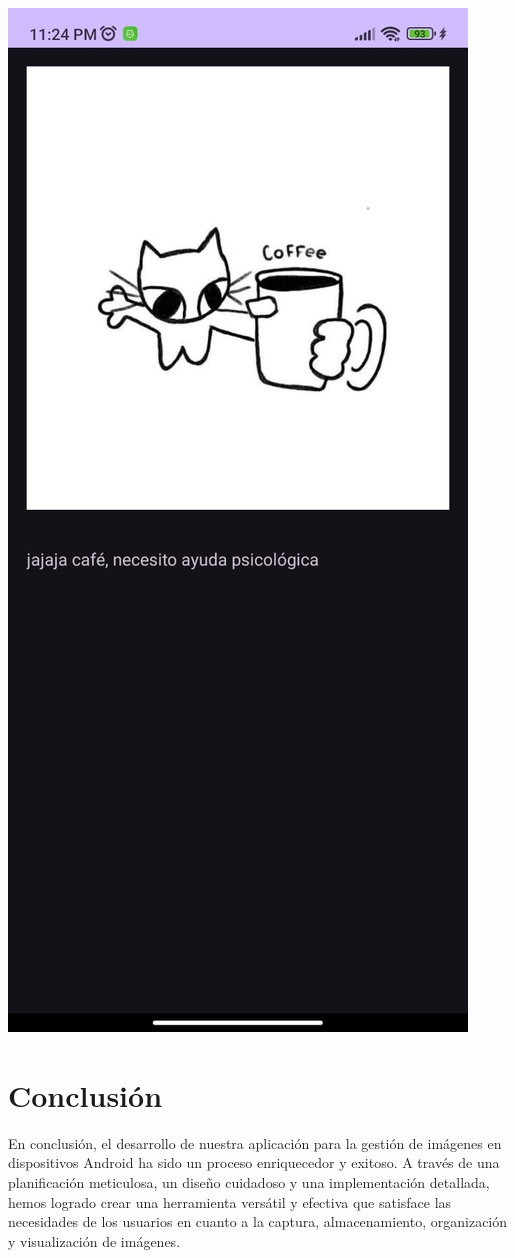 \documentclass[conference]{IEEEtran}
\begin{document}
{\includegraphics[width=\breite\linewidth]{figura3a.jpeg}}


\section{Conclusión}
En conclusión, el desarrollo de nuestra aplicación para la gestión de imágenes en dispositivos Android ha sido un proceso enriquecedor y exitoso. A través de una planificación meticulosa, un diseño cuidadoso y una implementación detallada, hemos logrado crear una herramienta versátil y efectiva que satisface las necesidades de los usuarios en cuanto a la captura, almacenamiento, organización y visualización de imágenes.
\end{document}

